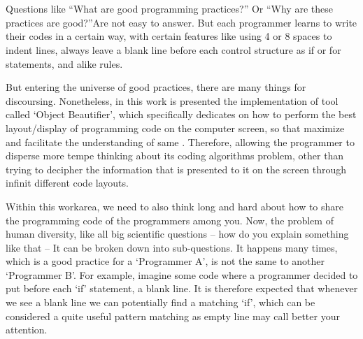 

%


\chapter{}


\begin{englishtext}

    Questions like ``What are good programming practices?'' Or ``Why are these
    practices are good?''Are not easy to answer. But each programmer learns to
    write their codes in a certain way, with certain features like using 4 or 8
    spaces to indent lines, always leave a blank line before each control
    structure as if or for statements, and alike rules.
    \cite{naturalCodingConventions}

    But entering the universe of good practices, there are many things for
    discoursing. Nonetheless, in this work is presented the implementation of
    tool called `Object Beautifier', which specifically dedicates on how to
    perform the best layout/display of programming code on the computer screen,
    so that maximize and facilitate the understanding of same
    \cite{automaticSynthesis}. Therefore, allowing the programmer to disperse
    more tempe thinking about its coding algorithms problem, other than trying
    to decipher the information that is presented to it on the screen through
    infinit different code layouts.


    Within this work\s area, we need to also think long and hard about how to
    share the programming code of the programmers among you. Now, the problem of
    human diversity, like all big scientific questions -- how do you explain
    something like that -- It can be broken down into sub-questions. It happens
    many times, which is a good practice for a `Programmer A', is not the same
    to another `Programmer B'. For example, imagine some code where a programmer
    decided to put before each `if' statement, a blank line. It is therefore
    expected that whenever we see a blank line we can potentially find a
    matching `if', which can be considered a quite useful pattern matching as
    empty line may call better your attention.


\end{englishtext}
